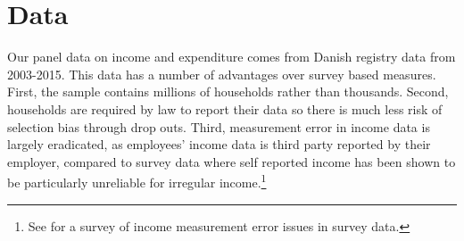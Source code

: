 \documentclass[titlepage]{\econtex}\newcommand{\texname}{ConsumptionHeterogeneity}
\begin{document}
\section{Data}
Our panel data on income and expenditure comes from Danish registry data from 2003-2015. This data has a number of advantages over survey based measures. First, the sample contains millions of households rather than thousands. Second, households are required by law to report their data so there is much less risk of selection bias through drop outs. Third, measurement error in income data is largely eradicated, as employees' income data is third party reported by their employer, compared to survey data where self reported income has been shown to be particularly unreliable for irregular income.\footnote{See \cite{david_income_nodate} for a survey of income measurement error issues in survey data.}
\end{document}
